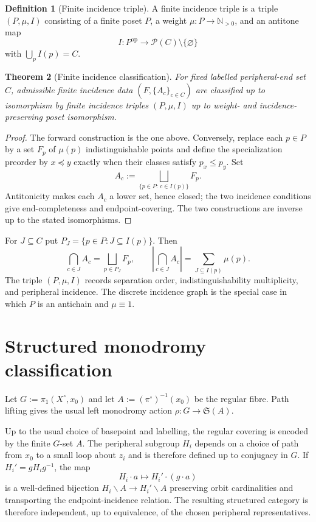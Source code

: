 \documentclass[11pt]{article}
\newcommand{\Sym}{\mathfrak{S}}
\theoremstyle{plain}
\newtheorem{theorem}{Theorem}[section]
\theoremstyle{definition}
\newtheorem{definition}[theorem]{Definition}
\begin{document}
\begin{definition}[Finite incidence triple]
A finite incidence triple is a triple $(P,\mu,I)$ consisting of a finite poset
$P$, a weight $\mu:P\to\mathbb N_{>0}$, and an antitone map
\[
I:P^{\mathrm{op}}\longrightarrow\mathcal P(C)\setminus\{\varnothing\}
\]
with $\bigcup_p I(p)=C$.
\end{definition}

\begin{theorem}[Finite incidence classification]
\label{thm:finite-incidence-classification}
For fixed labelled peripheral-end set $C$, admissible finite incidence data
$(F,\{A_c\}_{c\in C})$ are classified up to isomorphism by finite incidence
triples $(P,\mu,I)$ up to weight- and incidence-preserving poset isomorphism.
\end{theorem}

\begin{proof}
The forward construction is the one above.  Conversely, replace each $p\in P$
by a set $F_p$ of $\mu(p)$ indistinguishable points and define the
specialization preorder by $x\preceq y$ exactly when their classes satisfy
$p_x\leq p_y$.  Set
\[
A_c:=\bigsqcup_{\{p\in P:\,c\in I(p)\}}F_p.
\]
Antitonicity makes each $A_c$ a lower set, hence closed; the two incidence
conditions give end-completeness and endpoint-covering.  The two constructions are
inverse up to the stated isomorphisms.
\end{proof}

For $J\subseteq C$ put $P_J=\{p\in P:J\subseteq I(p)\}$.  Then
\[
\bigcap_{c\in J}A_c=\bigsqcup_{p\in P_J}F_p,
\qquad
\left|\bigcap_{c\in J}A_c\right|
=\sum_{J\subseteq I(p)}\mu(p).
\]
The triple $(P,\mu,I)$ records separation order, indistinguishability multiplicity, and peripheral incidence.  The discrete incidence graph is the special case in which $P$ is an antichain and $\mu\equiv1$.




\section{Structured monodromy classification}
\label{sec:structured-monodromy}

Let $G:=\pi_1(X^\circ,x_0)$ and let $A:=(\pi^\circ)^{-1}(x_0)$ be the
regular fibre.  Path lifting gives the usual left monodromy action
$\rho:G\to\Sym(A)$.

Up to the usual choice of basepoint and labelling, the regular covering is encoded by the finite $G$-set $A$.  The peripheral subgroup $H_i$ depends on a choice of path from $x_0$ to a small loop about $z_i$ and is therefore defined up to conjugacy in $G$.  If $H_i'=gH_ig^{-1}$, the map
\[
H_i\!\cdot a
\longmapsto
H_i'\!\cdot(g\cdot a)
\]
is a well-defined bijection $H_i\backslash A\to H_i'\backslash A$ preserving orbit cardinalities and transporting the endpoint-incidence relation.  The resulting structured category is therefore independent, up to equivalence, of the chosen peripheral representatives.
\end{document}

